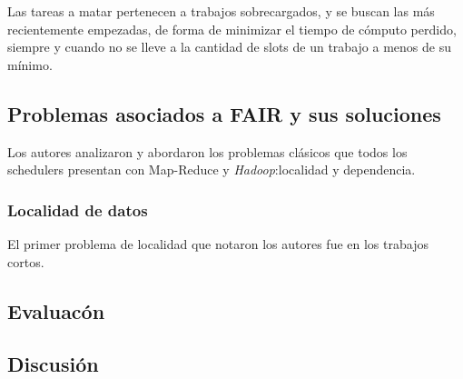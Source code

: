 \vspace{2mm}

Las tareas a matar pertenecen a trabajos sobrecargados, y se buscan las m\'as recientemente empezadas, de forma de minimizar el tiempo de c\'omputo perdido, siempre y cuando no se lleve a la cantidad de slots de un trabajo a menos de su m\'inimo.

\subsection{Problemas asociados a FAIR y sus soluciones}

Los autores analizaron y abordaron los problemas cl\'asicos que todos los schedulers presentan con Map-Reduce y \emph{Hadoop}:localidad y dependencia.

\subsubsection{Localidad de datos}

El primer problema de localidad que notaron los autores fue en los trabajos cortos.

\subsection{Evaluac\'on}

\subsection{Discusi\'on}
